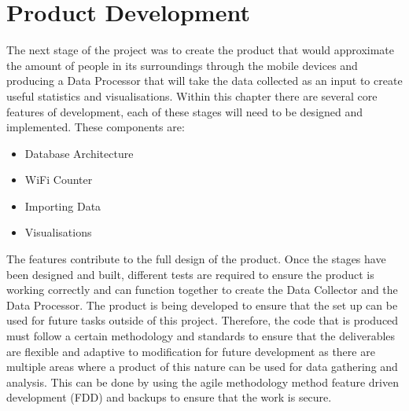 \documentclass{report}
\begin{document}
\chapter{Product Development}
The next stage of the project was to create the product that would approximate the amount of people in its surroundings through the mobile devices and producing a Data Processor that will take the data collected as an input to create useful statistics and visualisations. Within this chapter there are several core features of development, each of these stages will need to be designed and implemented. These components are: 
\begin{itemize}
    \item Database Architecture
    \item WiFi Counter
    \item Importing Data
    \item Visualisations
\end{itemize}
The features contribute to the full design of the product. Once the stages have been designed and built, different tests are required to ensure the product is working correctly and can function together to create the Data Collector and the Data Processor. The product is being developed to ensure that the set up can be used for future tasks outside of this project. Therefore, the code that is produced must follow a certain methodology and standards to ensure that the deliverables are flexible and adaptive to modification for future development as there are multiple areas where a product of this nature can be used for data gathering and analysis. This can be done by using the agile methodology method feature driven development (FDD) and backups to ensure that the work is secure.
\clearpage

\clearpage
\end{document}
